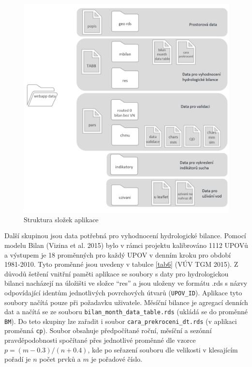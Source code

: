 \documentclass[12pt,]{article}
\begin{document}
\begin{figure}[H]
      \includegraphics[width=\textwidth]{fig/struktura2}
      \caption{Struktura složek aplikace}
      \label{fig:ch5.1}
\end{figure}

\qquad Další skupinou jsou data potřebná pro vyhodnocení hydrologické
bilance. Pomocí modelu Bilan (Vizina et al. 2015) bylo v rámci projektu
kalibrováno 1112 UPOVů a výstupem je 18 proměnných pro každý UPOV v
denním kroku pro období 1981-2010. Tyto proměnné jsou uvedeny v tabulce
\ref{tab6} (VÚV TGM 2015). Z důvodů šetření vnitřní paměti aplikace se
soubory s daty pro hydrologickou bilanci nacházejí na úložišti ve složce
\enquote{res} a jsou uloženy ve formátu .rds s názvy odpovídající
identům jednotlivých povrchových útvarů (\texttt{UPOV\_ID}). Aplikace
tyto soubory načítá pouze při požadavku uživatele. Měsíční bilance je
agregací denních dat a načítá se ze souboru
\texttt{bilan\_month\_data\_table.rds} (ukládá se do proměnné
\texttt{BM}). Do teto skupiny lze zařadit i soubor
\texttt{cara\_prekroceni\_dt.rds} (v aplikaci proměnná \texttt{cp}).
Soubor obsahuje předpočítané roční, měsíční a sezónní pravděpodobnosti
spočítané přes jednotlivé proměnné dle vzorce \(p = (m-0.3)/(n+0.4)\),
kde po seřazení souboru dle velikosti v klesajícím pořadí je \(n\) počet
prvků a \(m\) je pořadové číslo.
\end{document}
